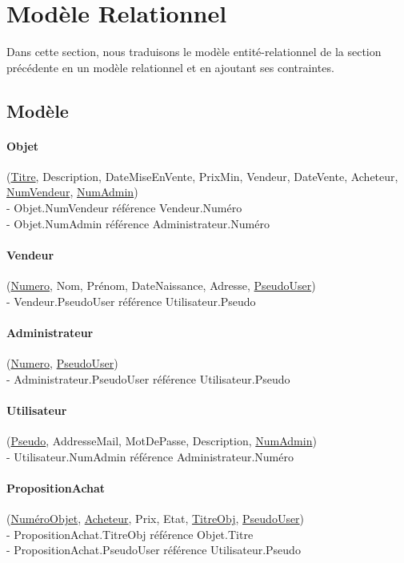 \documentclass{article}
\begin{document}
\newpage 

\section{Modèle Relationnel}
Dans cette section, nous traduisons le modèle entité-relationnel de la section précédente en un modèle relationnel et en ajoutant ses contraintes.

\subsection{Modèle}

\indent

\paragraph{Objet} (\underline{Titre}, Description, DateMiseEnVente, PrixMin, Vendeur, DateVente, Acheteur, \underline{NumVendeur}, \underline{NumAdmin})\\
\indent - Objet.NumVendeur référence Vendeur.Numéro\\
\indent - Objet.NumAdmin référence Administrateur.Numéro


\paragraph{Vendeur} (\underline{Numero}, Nom, Prénom, DateNaissance, Adresse, \underline{PseudoUser})\\
\indent - Vendeur.PseudoUser référence Utilisateur.Pseudo


\paragraph{Administrateur} (\underline{Numero}, \underline{PseudoUser})\\
\indent - Administrateur.PseudoUser référence Utilisateur.Pseudo


\paragraph{Utilisateur} (\underline{Pseudo}, AddresseMail, MotDePasse, 
Description, \underline{NumAdmin})\\
\indent - Utilisateur.NumAdmin référence Administrateur.Numéro


\paragraph{PropositionAchat} (\underline{NuméroObjet}, \underline{Acheteur}, Prix, Etat, \underline{TitreObj}, \underline{PseudoUser})\\
\indent - PropositionAchat.TitreObj référence Objet.Titre\\
\indent - PropositionAchat.PseudoUser référence Utilisateur.Pseudo
\end{document}
